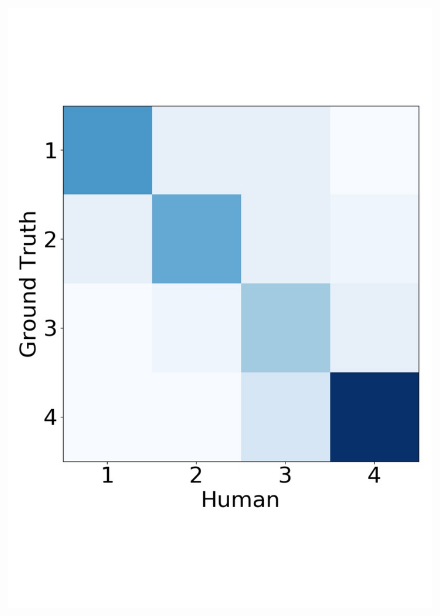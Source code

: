 \begin{figure}
{\begin{minipage}{0.25\linewidth}
			\includegraphics[width=1\linewidth]{human_4_pair}
	\end{minipage}}
\end{figure}
